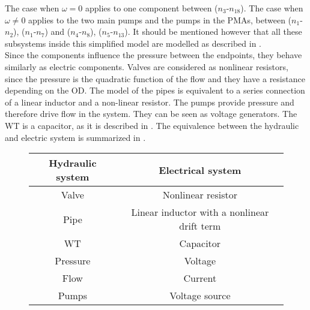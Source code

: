The case when $\omega = 0$ applies to one component between ($n_3$-$n_{18}$). The case when $\omega \neq 0$ applies to the two main pumps and the pumps in the PMAs, between ($n_1$-$n_2$), ($n_1$-$n_7$) and ($n_4$-$n_8$), ($n_5$-$n_{13}$). It should be mentioned however that all these subsystems inside this simplified model are modelled as described in . 
\\
Since the components influence the pressure between the endpoints, they behave similarly as electric components. Valves are considered as nonlinear resistors, since the pressure is the quadratic function of the flow and they have a resistance depending on the OD. 
The model of the pipes is equivalent to a series connection of a linear inductor and a non-linear resistor. %
The pumps provide pressure and therefore drive flow in the system. They can be seen as voltage generators. The WT is a capacitor, as it is described in . The equivalence between the hydraulic and electric system is summarized in .

\begin{figure}[H]
	\centering
\begin{tabular}{c|c} 
  			\bfseries Hydraulic system    &     \bfseries Electrical system  \\ \hline
			Valve		  	  &     Nonlinear resistor   \\ 
			Pipe              &     Linear inductor with a nonlinear drift term       \\ 
			WT 		          &     Capacitor       \\
			Pressure	 	  &     Voltage    \\
			Flow 		      &     Current       \\  
			Pumps 		      &     Voltage source           
\end{tabular}
		\label{tab:hydraulic_electrical}

\end{figure}	


	